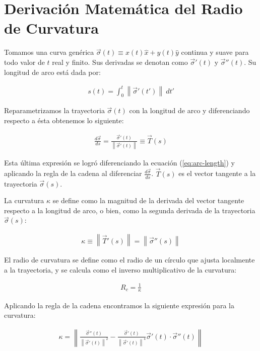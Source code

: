 \appendix
\newcommand{\norm}[1]{\left\lVert#1\right\rVert}

\chapter{Derivación Matemática del Radio de Curvatura}
\label{app:math-curvature-radius}

Tomamos una curva genérica $\vec{\sigma}(t) \equiv x(t) \hat{x} + y(t) \hat{y}$ continua y suave para todo valor de $t$ real y finito.
Sus derivadas se denotan como $\vec{\sigma}'(t)$ y $\vec{\sigma}''(t)$. Su longitud de arco está dada por:

\begin{align}
  s(t) = \int^t_0 \norm{\vec{\sigma}'(t')}~dt' \label{eq:arc-length}
\end{align}

Reparametrizamos la trayectoria $\vec{\sigma}(t)$ con la longitud de arco y diferenciando respecto a ésta obtenemos lo siguiente:

\begin{align}
  \frac{d\vec{\sigma}}{ds} = \frac{\vec{\sigma}'(t)}{\norm{\vec{\sigma}'(t)}} \equiv \vec{T}(s)
\end{align}

Esta última expresión se logró diferenciando la ecuación (\ref{eq:arc-length}) y aplicando la regla de la cadena al diferenciar
$\frac{d\vec{\sigma}}{ds}$. $\vec{T}(s)$ es el vector tangente a la trayectoria $\vec{\sigma}(s)$.

La curvatura $\kappa$ se define como la magnitud de la derivada del vector tangente respecto a la longitud de arco, o bien, como la
segunda derivada de la trayectoria $\vec{\sigma}(s)$:

\begin{align}
  \kappa \equiv \norm{\vec{T}'(s)} = \norm{\vec{\sigma}''(s)} 
\end{align}

El radio de curvatura se define como el radio de un círculo que ajusta localmente a la trayectoria, y se calcula como el inverso
multiplicativo de la curvatura:

\begin{align}
  R_c = \frac{1}{\kappa}
\end{align}

Aplicando la regla de la cadena encontramos la siguiente expresión para la curvatura:

\begin{align}
  \kappa = \norm{\frac{\vec{\sigma}''(t)}{\norm{\vec{\sigma}'(t)}^2} - \frac{\vec{\sigma}'(t)}{\norm{\vec{\sigma}'(t)}^4}
  \vec{\sigma}'(t)\cdot\vec{\sigma}''(t)} \label{eq:curvature}
\end{align}

